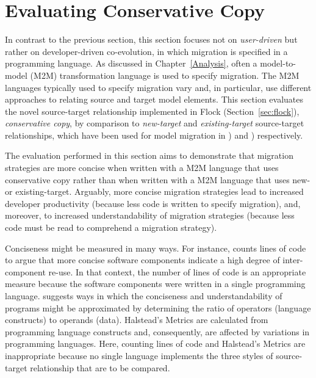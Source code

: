 
\section{Evaluating Conservative Copy}
\label{sec:quantitive}
In contrast to the previous section, this section focuses not on \emph{user-driven} but rather on developer-driven co-evolution, in which migration is specified in a programming language. As discussed in Chapter~\ref{Analysis}, often a model-to-model (M2M) transformation language is used to specify migration. The M2M languages typically used to specify migration vary and, in particular, use different approaches to relating source and target model elements. This section evaluates the novel source-target relationship implemented in Flock (Section~\ref{sec:flock}), \emph{conservative copy}, by comparison to \emph{new-target} and \emph{existing-target} source-target relationships, which have been used for model migration in \cite{cicchetti08automating,garces09managing}) and \cite{herrmannsdoerfer09cope,hussey06advanced}) respectively.

The evaluation performed in this section aims to demonstrate that migration strategies are more concise when written with a M2M language that uses conservative copy rather than when written with a M2M language that uses new- or existing-target. Arguably, more concise migration strategies lead to increased developer productivity (because less code is written to specify migration), and, moreover, to increased understandability of migration strategies (because less code must be read to comprehend a migration strategy).

Conciseness might be measured in many ways. For instance, \cite{kolovos09thesis} counts lines of code to argue that more concise software components indicate a high degree of inter-component re-use. In that context, the number of lines of code is an appropriate measure because the software components were written in a single programming language. \cite{halstead77softwarescience} suggests ways in which the conciseness and understandability of programs might be approximated by determining the ratio of operators (language constructs) to operands (data). Halstead's Metrics are calculated from programming language constructs and, consequently, are affected by variations in programming languages. Here, counting lines of code and Halstead's Metrics are inappropriate because no single language implements the three styles of source-target relationship that are to be compared.

